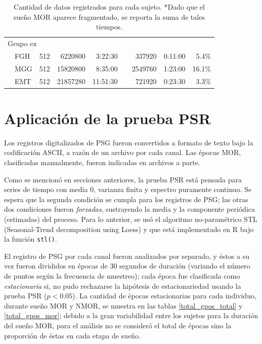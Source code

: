 \begin{table}
{\begin{tabular}{llcrrcrrr}
\multicolumn{6}{l}{{Grupo ex}}\\
&FGH &512       &6220800 &   3:22:30 &&337920  &   0:11:00 & 5.4\% \\
&MGG &512       &15820800&   8:35:00 &&2549760 &   1:23:00 &16.1\% \\
&EMT &512       &21857280&  11:51:30 &&721920  &   0:23:30 & 3.3\% \\
\bottomrule
\end{tabular}
}
\caption{Cantidad de datos registrados para cada sujeto. *Dado que el sueño MOR aparece fragmentado,
se reporta la suma de tales tiempos.}
\label{frecuencias}
\end{table}


\section{Aplicación de la prueba PSR}

Los registros digitalizados de PSG fueron convertidos a formato de texto bajo la codificación 
ASCII, a razón de un archivo por cada canal. 
Las épocas MOR, clasificadas manualmente, fueron indicadas en archivos a parte.

Como se mencionó en secciones anteriores, la prueba PSR está pensada para series de tiempo con 
media 0, varianza finita y espectro puramente continuo. Se espera que la segunda condición se 
cumpla para los registros de PSG; las otras dos condiciones fueron \textit{forzadas}, sustrayendo 
la media y la componente periódica (estimadas) del proceso.
Para lo anterior, se usó el algoritmo no-paramétrico STL (Seasonal-Trend decomposition using 
Loess) \cite{Cleveland1990} y que está implementado en R bajo la función \texttt{stl()}.


El registro de PSG por cada canal fueron analizados por separado, y éstos a su vez fueron divididos
en épocas de 30 segundos de duración (variando el número de puntos según la frecuencia de muestreo);
cada época fue clasificada como \textit{estacionaria} si, no pudo rechazarse la hipótesis de 
estacionariedad usando la prueba PSR ($p < 0.05$).
La cantidad de épocas estacionarias para cada individuo, durante sueño MOR y NMOR, se muestra en 
las tablas \ref{total_gpos_total} y \ref{total_gpos_mor}; debido a la gran variabilidad entre los 
sujetos para la duración del sueño MOR, para el análisis no se consideró el total de épocas sino la 
proporción de éstas en cada etapa de sueño. 

